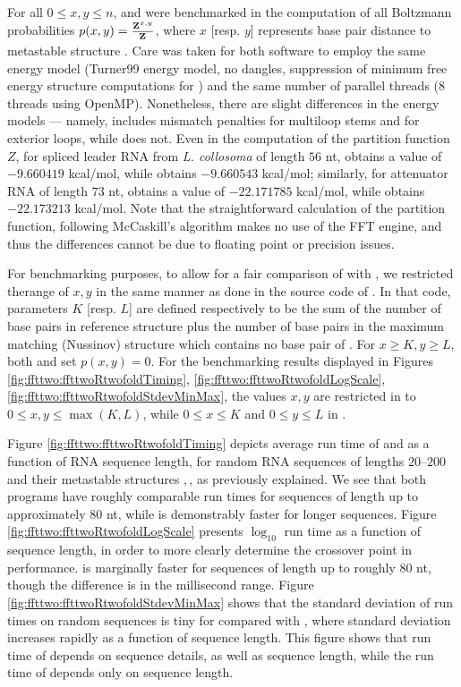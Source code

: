 For all $0 \leq x,y \leq n$, \rtwofold and \ffttwo were
benchmarked in the computation of all Boltzmann probabilities
$p(x,y)= \frac{{\bf Z}^{x,y}_{}}{{\bf Z}^{}_{}}$, where $x$ [resp. $y$] represents base pair
distance to metastable structure . Care was taken for
both software to employ the same energy model (Turner99 energy model,
no dangles, suppression of minimum free energy structure computations
for \rtwofold) and the same number of parallel threads ($8$ threads
using OpenMP). Nonetheless, there are slight differences in the energy
models --- namely, \rtwofold includes
mismatch penalties for multiloop stems and for exterior loops, while
\ffttwo does not. Even in the computation of the partition function
$Z$, for spliced leader RNA from {\em L. collosoma} of length $56$ nt,
\rtwofold {} obtains a value of
$-9.660419$ kcal/mol, while \ffttwo obtains
$-9.660543$ kcal/mol; similarly, for attenuator RNA of length $73$ nt,
\rtwofold {} obtains a value of
$-22.171785$ kcal/mol, while \ffttwo obtains
$-22.173213$ kcal/mol.
Note that the straightforward calculation of the partition function, following McCaskill's algorithm \cite{mcCaskill} makes no use of the FFT engine, and thus the differences cannot be due to floating point or precision issues.

For benchmarking purposes,
to allow for a fair comparison of \ffttwo
with \rtwofold, we restricted therange of $x,y$ in the same manner as done in the source code of \rtwofold.
In that code, parameters $K$ [resp. $L$] are defined respectively to be the
sum of the number of base pairs in reference structure  plus the number of base pairs in
the maximum matching (Nussinov) structure which contains
no base pair of .
For $x \geq K, y \geq L$, both \rtwofold and \ffttwo
set $p(x,y)=0$.  For the benchmarking results displayed in
Figures \ref{fig:ffttwo:ffttwoRtwofoldTiming},
\ref{fig:ffttwo:ffttwoRtwofoldLogScale},
\ref{fig:ffttwo:ffttwoRtwofoldStdevMinMax},
the values $x,y$ are restricted in
\ffttwo to $0 \leq x,y \leq \max(K,L)$, while $0 \leq x \leq K$
and $0 \leq y \leq L$ in \rtwofold.

Figure \ref{fig:ffttwo:ffttwoRtwofoldTiming} depicts average run time of \rtwofold
and \ffttwo as a function of RNA sequence length, for random RNA
sequences of lengths $20$--$200$ and their metastable structures \strA,\,\strB, as
previously explained.  We see that both programs have
roughly comparable run times for sequences of length up to approximately
$80$ nt, while \ffttwo is demonstrably faster for longer sequences.
Figure \ref{fig:ffttwo:ffttwoRtwofoldLogScale}
presents $\log_{10}$ run time as a function of sequence length, in order
to more clearly determine the crossover point in performance.
\rtwofold is marginally faster for sequences of
length up to roughly $80$ nt, though the difference is in the millisecond
range.
Figure \ref{fig:ffttwo:ffttwoRtwofoldStdevMinMax}
shows that the standard deviation of run times on random sequences is
tiny for \ffttwo compared with \rtwofold, where standard
deviation increases rapidly as a function of sequence length. This figure
shows that run time of \rtwofold depends on sequence details, as
well as sequence length, while the run time of \ffttwo depends only
on sequence length.

